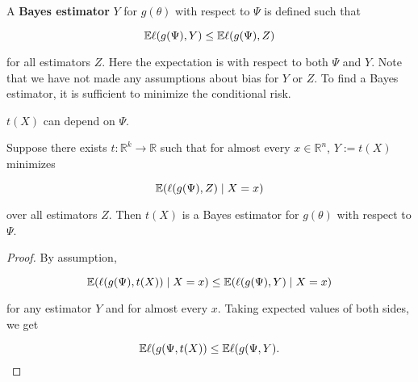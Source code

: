 \begin{definition} A \textbf{Bayes estimator} \(Y\) for \(g(\theta)\) with respect to \(\Psi\) is defined such that

\[
\E \ell(g(\Psi), Y) \leq \E \ell(g(\Psi), Z)
\]

for all estimators \(Z\). Here the expectation is with respect to both \(\Psi\) and \(Y\). Note that we have not made any assumptions about bias for \(Y\) or \(Z\). To find a Bayes estimator, it is sufficient to minimize the conditional risk.

\end{definition}

\begin{remark} \(t(X)\) can depend on \(\Psi\).

\end{remark}

\begin{proposition} Suppose there exists \(t: \mathbb{R}^k \to \mathbb{R}\) such that for almost every \(x \in \mathbb{R}^n\), \(Y := t(X) \) minimizes

\[
\E( \ell(g(\Psi), Z) \mid X = x)
\]

over all estimators \(Z\). Then \(t(X)\) is a Bayes estimator for \(g(\theta)\) with respect to \(\Psi\).

\end{proposition}

\begin{proof} By assumption,

\[
\E( \ell(g(\Psi), t(X)) \mid X = x) \leq \E( \ell(g(\Psi), Y) \mid X = x)
\]

for any estimator \(Y\) and for almost every \(x\). Taking expected values of both sides, we get

\[
\E \ell(g(\Psi, t(X)) \leq \E \ell(g(\Psi, Y). 
\]

\end{proof}

